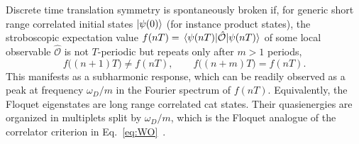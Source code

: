 \documentclass[%
reprint,
superscriptaddress,
amsmath,amssymb,
aps,
prb,
showkeys,%
floatfix,
]{revtex4-2}
\let\cite\citep   %
\begin{document}
	Discrete time translation symmetry is spontaneously broken if, for generic short range correlated initial states $\ket{\psi(0)}$ (for instance product states), the stroboscopic expectation value $f(nT)=\expval{\hat{\mathcal{O}}}{\psi(nT)}$ of some local observable $\hat{\mathcal{O}}$ is not $T$-periodic but repeats only after $m>1$ periods,
	\begin{equation}
		f\big((n+1)T\big)\neq f(nT), \qquad f\big((n+m)T\big)=f(nT).
		\label{eq:DTTSB}
	\end{equation}
	This manifests as a subharmonic response, which can be readily observed as a peak at frequency $\omega_D/m$ in the Fourier spectrum of $f(nT)$. Equivalently, the Floquet eigenstates are long range correlated cat states. Their quasienergies are organized in multiplets split by $\omega_D/m$, which is the Floquet analogue of the correlator criterion in Eq.~\eqref{eq:WO}~\cite{ElseBauerNayak2016,vonKeyserlingk2016,KhemaniRepTheory2017}.
	
\end{document}

